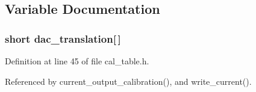 \subsection{Variable Documentation}
\subsubsection{\setlength{\rightskip}{0pt plus 5cm}short {\bf dac\_\-translation}[$\,$]}\label{ueaclib_8c_a2}




Definition at line 45 of file cal\_\-table.h.

Referenced by current\_\-output\_\-calibration(), and write\_\-current().